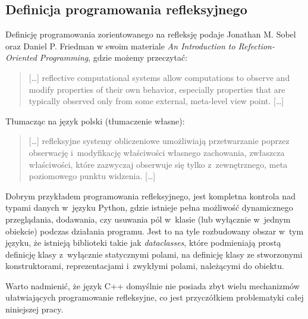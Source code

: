 \documentclass[12pt]{article}
\newcommand{\nonpl}[1]{{\it #1}}
\begin{document}
{		{
			\newpage
			\subsection{Definicja programowania refleksyjnego}

			Definicję programowania zorientowanego na refleksję podaje Jonathan M. Sobel oraz Daniel P. Friedman
			w swoim materiale \nonpl{An Introduction to Refection-Oriented Programming}\cite{reflection_definition},
			gdzie możemy przeczytać:

			\begin{quotation}
				[\ldots] reflective computational systems allow computations to observe and modify properties
				of their own behavior, especially properties that are typically observed only from some
				external, meta-level view point. [\ldots]
			\end{quotation}

			{\noindent Tłumacząc na język polski (tłumaczenie własne):}

			\begin{quotation}
				[\ldots] refleksyjne systemy obliczeniowe umożliwiają przetwarzanie poprzez obserwację i~modyfikację
				właściwości własnego zachowania, zwłaszcza właściwości, które zazwyczaj obserwuje się tylko z~zewnętrznego,
				meta poziomowego punktu widzenia. [\ldots]
			\end{quotation}

			Dobrym przykładem programowania refleksyjnego, jest kompletna kontrola nad typami danych w~języku Python,
			gdzie istnieje pełna możliwość dynamicznego przeglądania, dodawania, czy usuwania pól w~klasie (lub wyłącznie w~jednym obiekcie)
			podczas działania programu. Jest to na tyle rozbudowany obszar w~tym języku, że istnieją biblioteki takie jak
			\nonpl{dataclasses}\cite{python_dataclass}, które podmieniają prostą definicję klasy z~wyłącznie statycznymi polami,
			na definicję klasy ze stworzonymi konstruktorami, reprezentacjami i~zwykłymi polami, należącymi do obiektu.

			Warto nadmienić, że język C++ domyślnie nie posiada zbyt wielu mechanizmów ułatwiających programowanie refleksyjne,
			co jest przyczółkiem problematyki całej niniejszej pracy.
		}
	}
\end{document}
